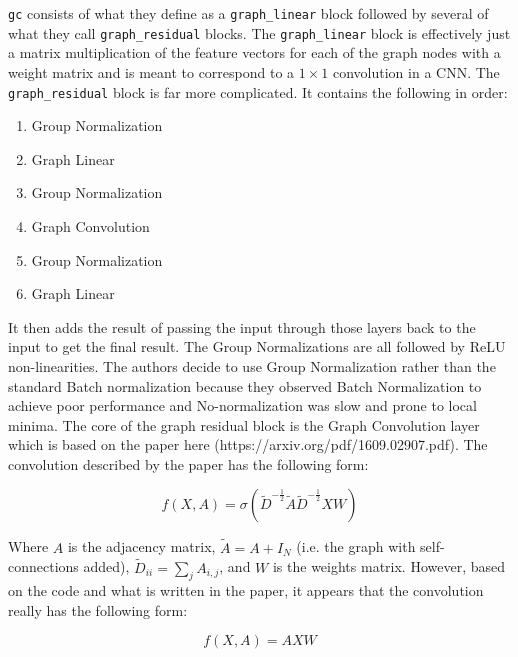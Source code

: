 \documentclass{report}
\begin{document}
	\texttt{gc} consists of what they define as a \texttt{graph\_linear} block followed by several of what they call \texttt{graph\_residual} blocks. The \texttt{graph\_linear} block is effectively just a matrix multiplication of the feature vectors for each of the graph nodes with a weight matrix and is meant to correspond to a $1 \times 1$ convolution in a CNN. The \texttt{graph\_residual} block is far more complicated. It contains the following in order:
	
	\begin{enumerate}
		\item Group Normalization 
		\item Graph Linear
		\item Group Normalization
		\item Graph Convolution
		\item Group Normalization
		\item Graph Linear
	\end{enumerate} 
	
	It then adds the result of passing the input through those layers back to the input to get the final result. The Group Normalizations are all followed by ReLU non-linearities. The authors decide to use Group Normalization rather than the standard Batch normalization because they observed Batch Normalization to achieve poor performance and No-normalization was slow and prone to local minima. The core of the graph residual block is the Graph Convolution layer which is based on the paper here (https://arxiv.org/pdf/1609.02907.pdf). The convolution described by the paper has the following form:
	
	\begin{equation}
	f(X, A) = \sigma\left(\tilde{D}^{-\frac{1}{2}} \tilde{A} \tilde{D}^{-\frac{1}{2}}XW\right)
	\end{equation}
	
	Where $A$ is the adjacency matrix, $\tilde{A} = A + I_N$ (i.e. the graph with self-connections added), $\tilde{D}_{ii} = \sum_{j} A_{i,j}$, and $W$ is the weights matrix. However, based on the code and what is written in the paper, it appears that the convolution really has the following form:
	
	\begin{equation}
	f(X, A) = AXW
	\end{equation}
\end{document}
